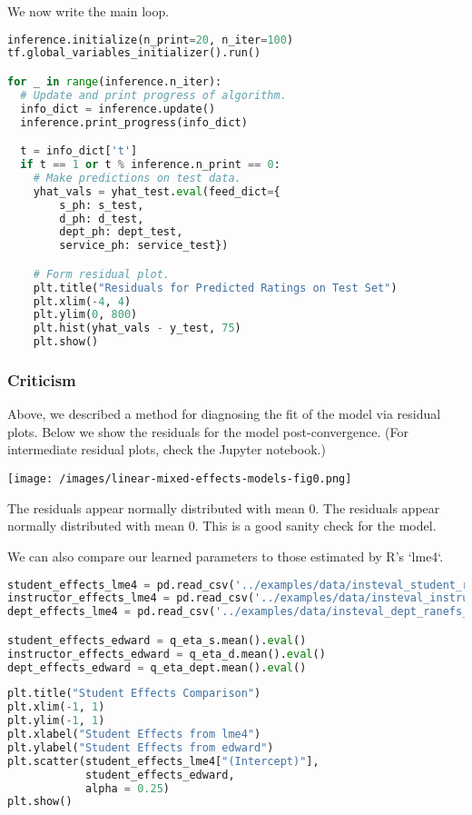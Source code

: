 We now write the main loop.

\begin{lstlisting}[language=Python]
inference.initialize(n_print=20, n_iter=100)
tf.global_variables_initializer().run()

for _ in range(inference.n_iter):
  # Update and print progress of algorithm.
  info_dict = inference.update()
  inference.print_progress(info_dict)

  t = info_dict['t']
  if t == 1 or t % inference.n_print == 0:
    # Make predictions on test data.
    yhat_vals = yhat_test.eval(feed_dict={
        s_ph: s_test,
        d_ph: d_test,
        dept_ph: dept_test,
        service_ph: service_test})

    # Form residual plot.
    plt.title("Residuals for Predicted Ratings on Test Set")
    plt.xlim(-4, 4)
    plt.ylim(0, 800)
    plt.hist(yhat_vals - y_test, 75)
    plt.show()
\end{lstlisting}

\subsubsection{Criticism}

Above, we described a method for diagnosing the fit of the model via
residual plots.
Below we show the residuals for the model post-convergence. (For
intermediate residual plots, check the Jupyter notebook.)

\texttt{[image: /images/linear-mixed-effects-models-fig0.png]}

The residuals appear normally distributed with mean 0. The residuals
appear normally distributed with mean 0. This is a good
sanity check for the model.

We can also compare our learned parameters to those estimated by R's
`lme4`.

\begin{lstlisting}[language=Python]
student_effects_lme4 = pd.read_csv('../examples/data/insteval_student_ranefs_r.csv')
instructor_effects_lme4 = pd.read_csv('../examples/data/insteval_instructor_ranefs_r.csv')
dept_effects_lme4 = pd.read_csv('../examples/data/insteval_dept_ranefs_r.csv')

student_effects_edward = q_eta_s.mean().eval()
instructor_effects_edward = q_eta_d.mean().eval()
dept_effects_edward = q_eta_dept.mean().eval()
\end{lstlisting}

\begin{lstlisting}[language=Python]
plt.title("Student Effects Comparison")
plt.xlim(-1, 1)
plt.ylim(-1, 1)
plt.xlabel("Student Effects from lme4")
plt.ylabel("Student Effects from edward")
plt.scatter(student_effects_lme4["(Intercept)"],
            student_effects_edward,
            alpha = 0.25)
plt.show()
\end{lstlisting}

